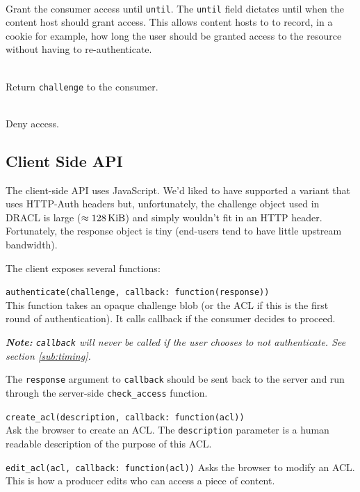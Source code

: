 \documentclass[pdftex,12pt,a4papaer,twoside,notitlepage]{report}
\newcommand{\note}[1]{\vspace{1em} \begin{spacing}{1}\textit{\textbf{Note:} #1}\end{spacing}\vspace{1em}}
\begin{document}
\begin{compactitem}[$\lambda$]
 \begin{description}[labelindent=2em,leftmargin=4em]
 \item[\texttt{Grant(until)}] \hfill \\
   Grant the consumer access until \texttt{until}. The \texttt{until} field
   dictates until when the content host should grant access. This allows content
   hosts to to record, in a cookie for example, how long the user should be
   granted access to the resource without having to re-authenticate.
 \item[\texttt{Continue(challenge)}] \hfill \\
   Return \texttt{challenge} to the consumer.
 \item[\texttt{Deny}] \hfill \\
   Deny access.
 \end{description}
\end{compactitem}

\subsection{Client Side API}

The client-side API uses JavaScript. We'd liked to have supported a variant that
uses HTTP-Auth headers but, unfortunately, the challenge object used in DRACL is
large ($\approx\unit[128]{KiB}$) and simply wouldn't fit in an HTTP header.
Fortunately, the response object is tiny (end-users tend to have little upstream
bandwidth).

The client exposes several functions:

\begin{compactitem}[$\lambda$]
\item \verb=authenticate(challenge, callback: function(response))= \\
  This function takes an opaque challenge blob (or the ACL if this is the first
  round of authentication). It calls callback if the consumer decides to
  proceed.

  \note{\texttt{callback} will never be called if the user chooses to not
    authenticate. See section \cref{sub:timing}.}

  The \texttt{response} argument to \texttt{callback} should be sent back to the
  server and run through the server-side \texttt{check\_access} function.
\item \verb=create_acl(description, callback: function(acl))= \\
  Ask the browser to create an ACL. The \texttt{description} parameter is a human
  readable description of the purpose of this ACL.
\item \verb=edit_acl(acl, callback: function(acl))=
  Asks the browser to modify an ACL. This is how a producer edits who can access
  a piece of content.
\end{compactitem}
\end{document}
